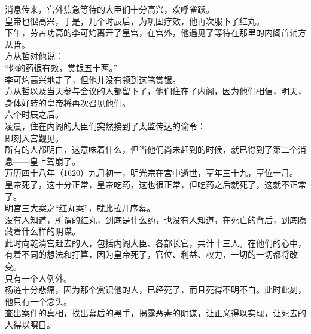 \begin{multicols}{\theparacolNo}
消息传来，宫外焦急等待的大臣们十分高兴，欢呼雀跃。\\

皇帝也很高兴，于是，几个时辰后，为巩固疗效，他再次服下了红丸。\\

下午，劳苦功高的李可灼离开了皇宫，在宫外，他遇见了等待在那里的内阁首辅方从哲。\\

方从哲对他说：\\

“你的药很有效，赏银五十两。”\\

李可灼高兴地走了，但他并没有领到这笔赏银。\\

方从哲以及当天参与会议的人都留下了，他们住在了内阁，因为他们相信，明天，身体好转的皇帝将再次召见他们。\\

六个时辰之后。\\

凌晨，住在内阁的大臣们突然接到了太监传达的谕令：\\

即刻入宫觐见。\\

所有的人都明白，这意味着什么，但当他们尚未赶到的时候，就已得到了第二个消息——皇上驾崩了。\\

万历四十八年（1620）九月初一，明光宗在宫中逝世，享年三十九，享位一月。\\

皇帝死了，这十分正常，皇帝吃药，这也很正常，但吃药之后就死了，这就不正常了。\\

明宫三大案之“红丸案”，就此拉开序幕。\\

没有人知道，所谓的红丸，到底是什么药，也没有人知道，在死亡的背后，到底隐藏着什么样的阴谋。\\

此时向乾清宫赶去的人，包括内阁大臣、各部长官，共计十三人。在他们的心中，有着不同的想法和打算，因为皇帝死了，官位、利益、权力，一切的一切都将改变。\\

只有一个人例外。\\

杨涟十分悲痛，因为那个赏识他的人，已经死了，而且死得不明不白。此时此刻，他只有一个念头。\\

查出案件的真相，找出幕后的黑手，揭露恶毒的阴谋，让正义得以实现，让死去的人得以瞑目。\\


\end{multicols}
